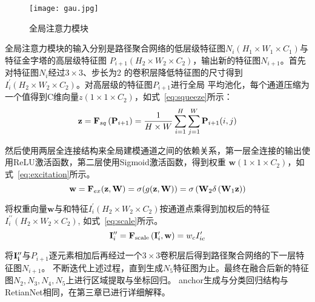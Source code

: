 \begin{figure}[htbp]                     
  \centering                      
  \texttt{[image: gau.jpg]}                      
  \caption{全局注意力模块}                      
  \label{fig:gau}       
\end{figure}  

全局注意力模块的输入分别是路径聚合网络的低层级特征图$N_i(H_1 \times W_1 \times C_1)$与特征金字塔的高层级特征图
$P_{i + 1}(H_2 \times W_2 \times C_2)$，输出新的特征图$N_{i + 1}$。首先对特征图$N_i$经过$3\times 3$、步长为2
的卷积层降低特征图的尺寸得到$I^{\prime}_i({H_2} \times {W_2} \times {C_2})$。对高层级的特征图$P_{i + 1}$进行全局
平均池化，每个通道压缩为一个值得到C维向量$z(1 \times 1 \times {C_2})$，如式~\ref{eq:squeeze}所示：
\begin{equation}   
  \mathbf{z} = {{\bf{F}}_{sq}}\left( {{{\bf{P}}_{i + 1}}} \right) = \frac{1}{{H \times W}}\sum\limits_{i = 1}^H {\sum\limits_{j = 1}^W {{{\bf{P}}_{i + 1}}} } (i,j)
  \label{eq:squeeze} 
\end{equation}

然后使用两层全连接结构来全局建模通道之间的依赖关系，第一层全连接的输出使用ReLU激活函数，第二层使用Sigmoid激活函数，得到权重
$\mathbf{w}(1 \times 1 \times {C_2})$，如式~\ref{eq:excitation}所示。
\begin{equation}   
  {\bf{w}} = {{\bf{F}}_{ex}}({\bf{z}},{\bf{W}}) = \sigma (g({\bf{z}},{\bf{W}})) = \sigma \left( {{{\bf{W}}_2}\delta \left( {{{\bf{W}}_1}{\bf{z}}} \right)} \right)
  \label{eq:excitation} 
\end{equation}

将权重向量$\mathbf{w}$与和特征$I^{\prime}_i({H_2} \times {W_2} \times {C_2})$按通道点乘得到加权后的特征$I^{\prime \prime}_i({H_2} \times {W_2} \times {C_2})$,
如式~\ref{eq:scale}所示。
\begin{equation}   
  {\bf{I}}_i^{\prime \prime } = {{\bf{F}}_{{\rm{scale }}}}\left( {{\bf{I}}_i^\prime ,{\bf{w}}} \right) = {w_c}I^\prime_{ic}
  \label{eq:scale} 
\end{equation}

将$\bf{I}_i^{\prime \prime}$与$P_{i + 1}$逐元素相加后再经过一个$3\times3$卷积层后得到路径聚合网络的下一层特征图$N_{i + 1}$。
不断迭代上述过程，直到生成$N_5$特征图为止。最终在融合后新的特征图$N_2, N_3, N_4, N_5$上进行区域提取与坐标回归。
anchor生成与分类回归结构与RetianNet相同，在第三章已进行详细解释。

